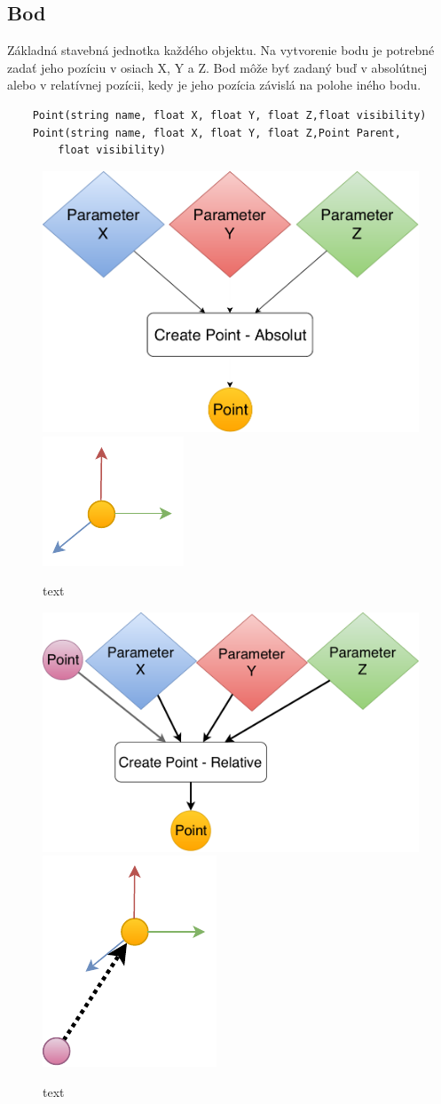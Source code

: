 \subsection{Bod}
Základná stavebná jednotka každého objektu. Na vytvorenie bodu je potrebné zadať jeho pozíciu v osiach X, Y a Z. Bod môže byť zadaný buď v absolútnej alebo v relatívnej pozícii, kedy je jeho pozícia závislá na polohe iného bodu.
\begin{lstlisting}
    Point(string name, float X, float Y, float Z,float visibility) 
    Point(string name, float X, float Y, float Z,Point Parent,
        float visibility)
\end{lstlisting}

\begin{figure}[H]
	\centering
	\includegraphics[height=0.3\textwidth]{obrazky-figures/Diagram/DP Navrh operacii-0D - Point.pdf}
	\includegraphics[height=0.3\textwidth]{obrazky-figures/Diagram/Draw/1Points/DP Navrh operacii-0D - Point.pdf}
	\caption{text}
	\label{fig:1}
\end{figure}
\begin{figure}[H]
	\centering
	\includegraphics[height=0.3\textwidth]{obrazky-figures/Diagram/DP Navrh operacii-0D - Point2.pdf}
	\includegraphics[height=0.3\textwidth]{obrazky-figures/Diagram/Draw/1Points/DP Navrh operacii-0D - PointRelative.pdf}
	\caption{text}
	\label{fig:1}
\end{figure}

